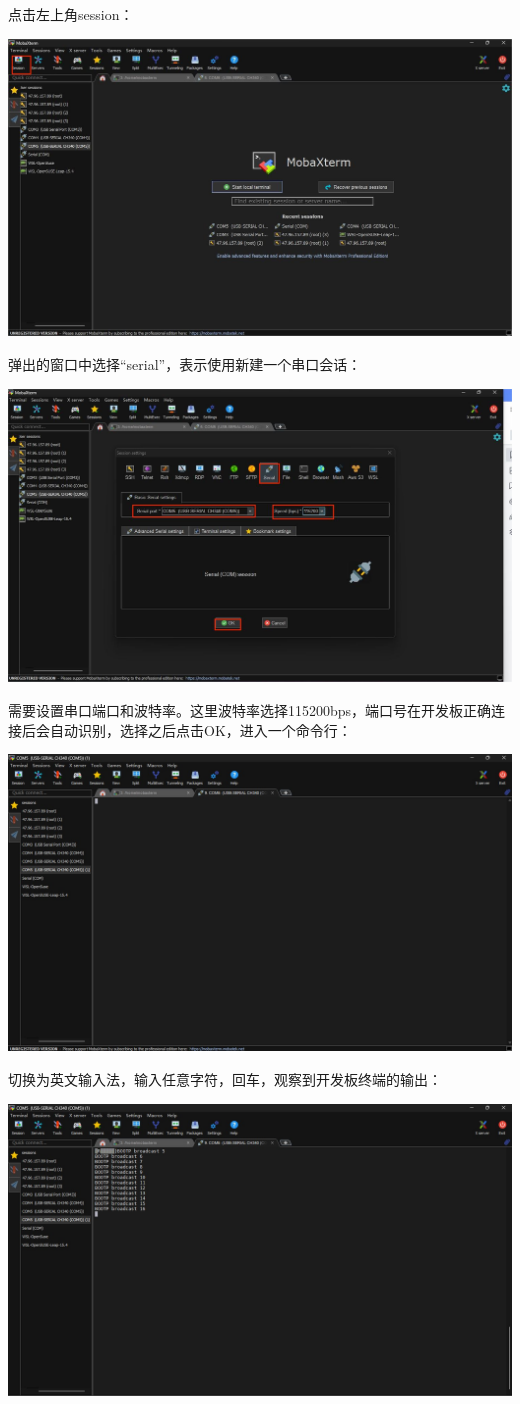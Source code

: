 \begin{enumerate}
	点击左上角session：
	
	\centering
	\includegraphics[width=0.58\linewidth]{figures/08-02-session.jpg}
	\raggedright
	
	弹出的窗口中选择“serial”，表示使用新建一个串口会话：
	
	\centering
	\includegraphics[width=0.58\linewidth]{figures/08-02-串口设置.jpg}
	\raggedright
	
	
	需要设置串口端口和波特率。这里波特率选择115200bps，端口号在开发板正确连接后会自动识别，选择之后点击OK，进入一个命令行：
	
	\centering
	\includegraphics[width=0.58\linewidth]{figures/08-02-串口命令行.jpg}
	\raggedright
	
	切换为英文输入法，输入任意字符，回车，观察到开发板终端的输出：
	
	\centering
	\includegraphics[width=0.58\linewidth]{figures/08-02-串口输出.jpg}
	\raggedright
	

\end{enumerate}
